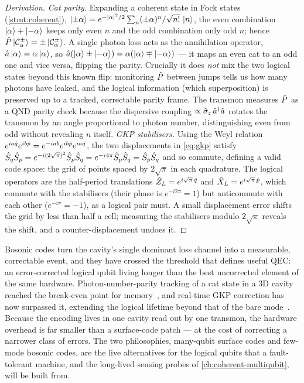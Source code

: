 \begin{proof}[Derivation]
\emph{Cat parity.} Expanding a coherent state in Fock states
(\cref{stmt:coherent}), $\ket{\pm\alpha}=e^{-|\alpha|^2/2}\sum_n
(\pm\alpha)^n/\sqrt{n!}\,\ket{n}$, the even combination
$\ket{\alpha}+\ket{-\alpha}$ keeps only even $n$ and the odd combination
only odd $n$; hence $\hat{P}\ket{\mathcal C^\pm_\alpha}
=\pm\ket{\mathcal C^\pm_\alpha}$. A single photon loss acts as the
annihilation operator, $\hat{a}\ket{\alpha}=\alpha\ket{\alpha}$, so
$\hat{a}(\ket{\alpha}\pm\ket{-\alpha})=\alpha(\ket{\alpha}\mp\ket{-\alpha})$
--- it maps an even cat to an odd one and vice versa, flipping the
parity. Crucially it does \emph{not} mix the two logical states beyond
this known flip: monitoring $\hat{P}$ between jumps tells us how many
photons have leaked, and the logical information (which superposition)
is preserved up to a tracked, correctable parity frame. The transmon
measures $\hat{P}$ as a QND parity check because the dispersive coupling
$\propto\hat\sigma_z\,\hat{a}^\dagger\hat{a}$ rotates the transmon by an
angle proportional to photon number, distinguishing even from odd
without revealing $n$ itself. \emph{GKP stabilisers.} Using the Weyl
relation $e^{ia\hat{q}}e^{ib\hat{p}}=e^{-iab}e^{ib\hat{p}}e^{ia\hat{q}}$, the two
displacements in \cref{eq:gkp} satisfy
$\hat{S}_q\hat{S}_p=e^{-i(2\sqrt\pi)^2}\hat{S}_p\hat{S}_q=e^{-i4\pi}\hat{S}_p\hat{S}_q
=\hat{S}_p\hat{S}_q$ and so commute, defining a valid code space: the
grid of points spaced by $2\sqrt\pi$ in each quadrature. The logical
operators are the half-period translations
$\hat{Z}_L=e^{i\sqrt\pi\,\hat{q}}$ and $\hat{X}_L=e^{i\sqrt\pi\,\hat{p}}$, which
commute with the stabilisers (their phase is $e^{-i2\pi}=1$) but
anticommute with each other ($e^{-i\pi}=-1$), as a logical pair must. A
small displacement error shifts the grid by less than half a cell;
measuring the stabilisers modulo $2\sqrt\pi$ reveals the shift, and a
counter-displacement undoes it.
\end{proof}

\begin{application}
\label{app:break-even}
Bosonic codes turn the cavity's single dominant loss channel into a
measurable, correctable event, and they have crossed the threshold that
defines useful QEC: an error-corrected logical qubit living longer than
the best uncorrected element of the same hardware. Photon-number-parity
tracking of a cat state in a 3D cavity reached the break-even point for
memory~\cite{ofek2016}, and real-time GKP correction has now surpassed
it, extending the logical lifetime beyond that of the bare
mode~\cite{sivak2023}. Because the encoding lives in one cavity read out
by one transmon, the hardware overhead is far smaller than a surface-code
patch --- at the cost of correcting a narrower class of errors. The two
philosophies, many-qubit surface codes and few-mode bosonic codes, are
the live alternatives for the logical qubits that a fault-tolerant
machine, and the long-lived sensing probes of \cref{ch:coherent-multiqubit},
will be built from.
\end{application}

